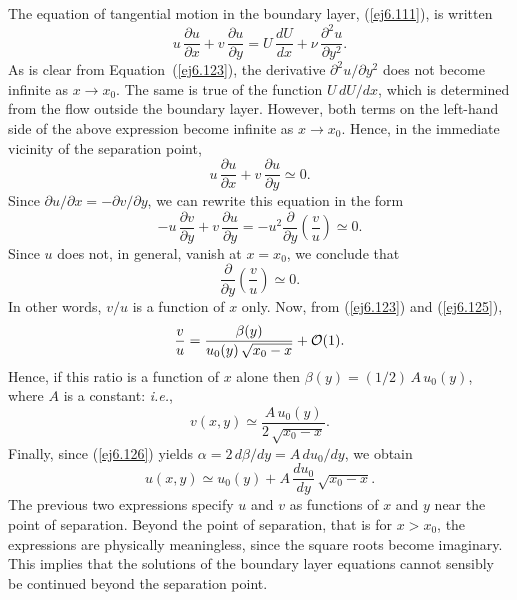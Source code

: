The equation of tangential motion in the boundary layer, (\ref{ej6.111}), is written
\begin{equation}
u\,\frac{\partial u}{\partial x} + v\,\frac{\partial u}{\partial y} = U\,\frac{dU}{dx} +\nu\,\frac{\partial^2 u}{\partial y^2}.
\end{equation}
As is clear from Equation~(\ref{ej6.123}), the derivative $\partial^2 u/\partial y^2$ does not become
infinite as $x\rightarrow x_0$. The same is true of the function $U\,dU/dx$, which is determined from  the
flow outside the boundary layer. However, both terms on the left-hand side of the above expression become
infinite as $x\rightarrow x_0$. Hence, in the immediate vicinity of the separation point,
\begin{equation}
u\,\frac{\partial u}{\partial x} + v\,\frac{\partial u}{\partial y} \simeq 0.
\end{equation}
Since $\partial u/\partial x = -\partial v/\partial y$, we can rewrite this equation in the form
\begin{equation}
-u\,\frac{\partial v}{\partial y} +v\,\frac{\partial u}{\partial y} =- u^2\frac{\partial}{\partial y}\!\left(\frac{v}{u}\right)\simeq 0.
\end{equation}
Since $u$ does not, in general, vanish at $x=x_0$, we conclude that
\begin{equation}
\frac{\partial}{\partial y}\!\left(\frac{v}{u}\right)\simeq 0.
\end{equation}
In other words, $v/u$ is a function of $x$ only. Now, from (\ref{ej6.123}) and (\ref{ej6.125}), 
\begin{equation}
\frac{v}{u} = \frac{\beta(y)}{u_0(y)\,\sqrt{x_0-x}}+ {\cal O}(1).
\end{equation}
Hence, if this ratio is a function of $x$ alone then $\beta(y) = (1/2)\,A\,u_0(y)$, where $A$ is a constant: {\em i.e.},
\begin{equation}\label{ej6.132}
v(x,y)\simeq \frac{A\,u_0(y)}{2\,\sqrt{x_0-x}}.
\end{equation}
Finally, since (\ref{ej6.126}) yields $\alpha=2\,d\beta/dy=A\,du_0/dy$,  we obtain
\begin{equation}\label{ej6.133}
u(x,y) \simeq u_0(y) + A\,\frac{du_0}{dy}\,\sqrt{x_0-x}.
\end{equation}
The previous two expressions specify $u$ and $v$ as functions of $x$ and $y$ 
near the point of separation. Beyond the point of separation, that is
for $x>x_0$, the expressions are physically meaningless, since the
square roots become imaginary. This implies that the solutions of the
boundary layer equations cannot sensibly be  continued beyond the separation
point. 

